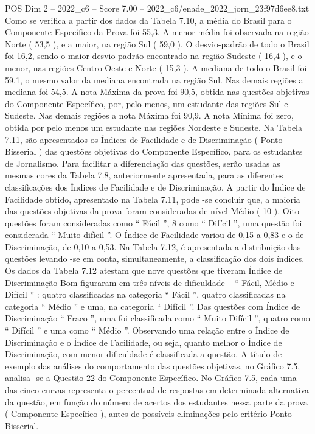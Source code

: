\begin{textsample}{POS Dim 2 – 2022\_c6 – Score 7.00 – 2022\_c6/enade\_2022\_jorn\_23f97d6ee8.txt}
Como se verifica a partir dos dados da Tabela 7.10, a média do Brasil para o Componente Específico da Prova foi 55,3.
A menor média foi observada na região Norte ( 53,5 ), e a maior, na região Sul ( 59,0 ).
O desvio-padrão de todo o Brasil foi 16,2, sendo o maior desvio-padrão encontrado na região Sudeste ( 16,4 ), e o menor, nas regiões Centro-Oeste e Norte ( 15,3 ).
A mediana de todo o Brasil foi 59,1, o mesmo valor da mediana encontrada na região Sul.
Nas demais regiões a mediana foi 54,5.
A nota Máxima da prova foi 90,5, obtida nas questões objetivas do Componente Específico, por, pelo menos, um estudante das regiões Sul e Sudeste.
Nas demais regiões a nota Máxima foi 90,9.
A nota Mínima foi zero, obtida por pelo menos um estudante nas regiões Nordeste e Sudeste.
Na Tabela 7.11, são apresentados os Índices de Facilidade e de Discriminação ( Ponto-Bisserial ) das questões objetivas do Componente Específico, para os estudantes de Jornalismo.
Para facilitar a diferenciação das questões, serão usadas as mesmas cores da Tabela 7.8, anteriormente apresentada, para as diferentes classificações dos Índices de Facilidade e de Discriminação.
A partir do Índice de Facilidade obtido, apresentado na Tabela 7.11, pode -se concluir que, a maioria das questões objetivas da prova foram consideradas de nível Médio ( 10 ).
Oito questões foram consideradas como “ Fácil ”, 8 como “ Difícil ”, uma questão foi considerada “ Muito difícil ”.
O Índice de Facilidade variou de 0,15 a 0,83 e o de Discriminação, de 0,10 a 0,53.
Na Tabela 7.12, é apresentada a distribuição das questões levando -se em conta, simultaneamente, a classificação dos dois índices.
Os dados da Tabela 7.12 atestam que nove questões que tiveram Índice de Discriminação Bom figuraram em três níveis de dificuldade – “ Fácil, Médio e Difícil ” : quatro classificadas na categoria “ Fácil ”, quatro classificadas na categoria “ Médio ” e uma, na categoria “ Difícil ”.
Das questões com Índice de Discriminação “ Fraco ”, uma foi classificada como “ Muito Difícil ”, quatro como “ Difícil ” e uma como “ Médio ”.
Observando uma relação entre o Índice de Discriminação e o Índice de Facilidade, ou seja, quanto melhor o Índice de Discriminação, com menor dificuldade é classificada a questão.
A título de exemplo das análises do comportamento das questões objetivas, no Gráfico 7.5, analisa -se a Questão 22 do Componente Específico.
No Gráfico 7.5, cada uma das cinco curvas representa o percentual de respostas em determinada alternativa da questão, em função do número de acertos dos estudantes nessa parte da prova ( Componente Específico ), antes de possíveis eliminações pelo critério Ponto-Bisserial.

\end{textsample}
